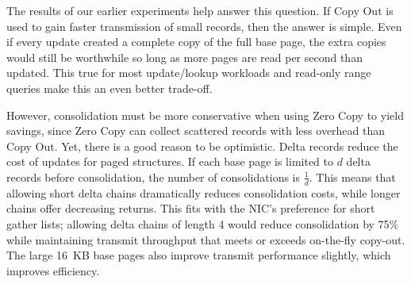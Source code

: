 


The results of our earlier experiments help answer this question.  If Copy Out
is used to gain faster transmission of small records, then the answer is
simple. Even if every update created a complete copy of the full base page, the
extra copies would still be worthwhile so long as more pages are read per
second than updated. This true for most update/lookup workloads and read-only
range queries make this an even better trade-off.

However, consolidation must be more conservative when using Zero Copy to yield
savings, since Zero Copy can collect scattered records with less overhead than
Copy Out. Yet, there is a good reason to be optimistic.  Delta records
reduce the cost of updates for paged structures. If each base page is limited
to $d$ delta records before consolidation, the number of consolidations is
$\frac{1}{d}$. This means that allowing short delta chains dramatically reduces
consolidation costs, while longer chains offer decreasing returns. This fits with
the NIC's preference for short gather lists; allowing delta chains of length 4
would reduce consolidation by 75\% while maintaining transmit throughput that
meets or exceeds on-the-fly copy-out.  The large 16~KB base pages also
improve transmit performance slightly, which improves efficiency.

